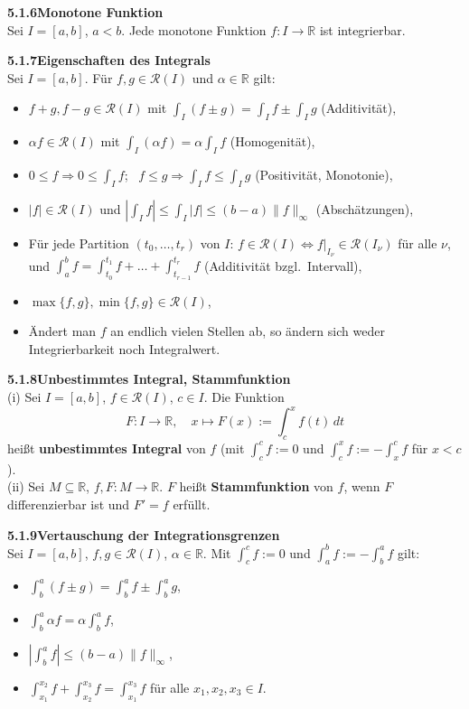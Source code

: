 \documentclass[a4paper,12pt]{article}
\newcommand{\gentry}[3]{%
  \noindent\textbf{#1\quad #2}\nopagebreak\\[0.2em]
  #3\par\smallskip
}
\begin{document}
\gentry{5.1.6}{Monotone Funktion}{%
  Sei $I=[a,b]$, $a<b$. Jede monotone Funktion $f: I \to \mathbb{R}$ ist
  integrierbar.
}

\gentry{5.1.7}{Eigenschaften des Integrals}{%
  Sei $I=[a,b]$. Für $f, g \in \mathcal{R}(I)$ und $\alpha \in \mathbb{R}$ gilt:
  \begin{itemize}[topsep=2pt,itemsep=1pt]
    \item $f+g, f-g \in \mathcal{R}(I)$ mit $\int_I (f\pm g) = \int_I f \pm \int_I g$ \hfill (Additivität),
    \item $\alpha f \in \mathcal{R}(I)$ mit $\int_I (\alpha f) = \alpha \int_I f$ \hfill (Homogenität),
    \item $0 \leq f \Rightarrow 0 \leq \int_I f$; \ $f \leq g \Rightarrow \int_I f \leq \int_I g$ \hfill (Positivität, Monotonie),
    \item $|f| \in \mathcal{R}(I)$ und $\left|\int_I f\right| \leq \int_I |f| \leq (b-a)\|f\|_\infty$ \hfill (Abschätzungen),
    \item Für jede Partition $(t_0,\ldots,t_r)$ von $I$: $f \in \mathcal{R}(I) \Leftrightarrow f|_{I_\nu} \in \mathcal{R}(I_\nu)$ für alle $\nu$, und
          $\int_a^b f = \int_{t_0}^{t_1} f + \ldots + \int_{t_{r-1}}^{t_r} f$ \hfill (Additivität bzgl.\ Intervall),
    \item $\max\{f,g\}, \min\{f,g\} \in \mathcal{R}(I)$,
    \item Ändert man $f$ an endlich vielen Stellen ab, so ändern sich weder
          Integrierbarkeit noch Integralwert.
  \end{itemize}
}

\gentry{5.1.8}{Unbestimmtes Integral, Stammfunktion}{%
  (i) Sei $I=[a,b]$, $f \in \mathcal{R}(I)$, $c \in I$. Die Funktion
  \[
    F: I \to \mathbb{R}, \quad x \mapsto F(x) := \int_c^x f(t)\,dt
  \]
  heißt \textbf{unbestimmtes Integral} von $f$ (mit $\int_c^c f := 0$ und
  $\int_c^x f := -\int_x^c f$ für $x<c$).\\
  (ii) Sei $M \subseteq \mathbb{R}$, $f, F: M \to \mathbb{R}$. $F$ heißt
  \textbf{Stammfunktion} von $f$, wenn $F$ differenzierbar ist und $F' = f$
  erfüllt.
}

\gentry{5.1.9}{Vertauschung der Integrationsgrenzen}{%
  Sei $I=[a,b]$, $f, g \in \mathcal{R}(I)$, $\alpha \in \mathbb{R}$. Mit
  $\int_c^c f := 0$ und $\int_a^b f := -\int_b^a f$ gilt:
  \begin{itemize}[topsep=2pt,itemsep=1pt]
    \item $\int_b^a (f \pm g) = \int_b^a f \pm \int_b^a g$,
    \item $\int_b^a \alpha f = \alpha \int_b^a f$,
    \item $\left|\int_b^a f\right| \leq (b-a)\|f\|_\infty$,
    \item $\int_{x_1}^{x_2} f + \int_{x_2}^{x_3} f = \int_{x_1}^{x_3} f$ für alle $x_1, x_2, x_3 \in I$.
  \end{itemize}
}
\end{document}
